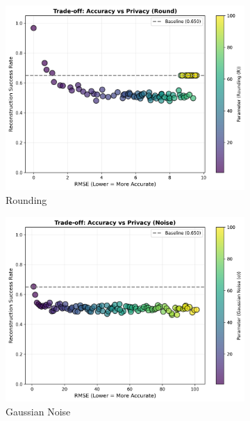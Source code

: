 \documentclass[11pt,letterpaper]{article}
\begin{document}
\begin{figure}[H]
    \centering
    \begin{subfigure}[b]{0.45\textwidth}
        \centering
        \includegraphics[width=\textwidth]{tradeoff_round.png}
        \caption{Rounding}
    \end{subfigure}
    \hfill
    \begin{subfigure}[b]{0.45\textwidth}
        \centering
        \includegraphics[width=\textwidth]{tradeoff_noise.png}
        \caption{Gaussian Noise}
    \end{subfigure}
    \hfill
    \begin{subfigure}[b]{0.45\textwidth}
        \centering

\end{subfigure}
\end{figure}
\end{document}
